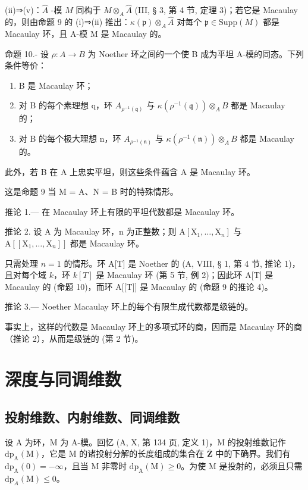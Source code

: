 (ii)⇒(v)：\(\hat{A}\) -模 \(\hat{M}\) 同构于 \(M\otimes_{A}\hat{A}\) (III, § 3, 第 4 节, 定理 3)；若它是 Macaulay 的，则由命题 9 的 (i)⇒(ii) 推出：\(\kappa(\mathfrak{p})\otimes_{A}\hat{A}\) 对每个 \(\mathfrak{p}\in\mathrm{Supp}(M)\) 都是 Macaulay 环，且 A-模 M 是 Macaulay 的。

命题 10.- 设 \(\rho: A \to B\) 为 Noether 环之间的一个使 B 成为平坦 A-模的同态。下列条件等价：

\begin{enumerate}
\def\labelenumi{(\roman{enumi})}
\item
  B 是 Macaulay 环；
\item
  对 B 的每个素理想 q，环 \(A_{\rho^{-1}(\mathfrak{q})}\) 与 \(\kappa(\rho^{-1}(\mathfrak{q}))\otimes_{A}B\) 都是 Macaulay 的；
\item
  对 B 的每个极大理想 n，环 \(A_{\rho^{-1}(\mathfrak{n})}\) 与 \(\kappa(\rho^{-1}(\mathfrak{n})) \otimes_{A} B\) 都是 Macaulay 的。
\end{enumerate}

此外，若 B 在 A 上忠实平坦，则这些条件蕴含 A 是 Macaulay 环。

这是命题 9 当 M = A、N = B 时的特殊情形。

推论 1.--- 在 Macaulay 环上有限的平坦代数都是 Macaulay 环。

推论 2. 设 A 为 Macaulay 环，n 为正整数；则 \(\mathrm{A}[\mathrm{X}_1,\dots ,\mathrm{X}_n]\) 与 \(\mathrm{A}[[\mathrm{X}_1,\dots ,\mathrm{X}_n]]\) 都是 Macaulay 环。

只需处理 \(n = 1\) 的情形。环 A{[}T{]} 是 Noether 的 (A, VIII, § 1, 第 4 节, 推论 1)，且对每个域 \(k\)，环 \(k[T]\) 是 Macaulay 环 (第 5 节, 例 2)；因此环 A{[}T{]} 是 Macaulay 的 (命题 10)，而环 A{[}{[}T{]}{]} 是 Macaulay 的 (命题 9 的推论 4)。

推论 3.--- Noether Macaulay 环上的每个有限生成代数都是级链的。

事实上，这样的代数是 Macaulay 环上的多项式环的商，因而是 Macaulay 环的商（推论 2），从而是级链的 (第 2 节)。

\section{深度与同调维数}

\subsection{投射维数、内射维数、同调维数}

设 A 为环，M 为 A-模。回忆 (A, X, 第 134 页, 定义 1)，M 的投射维数记作 \(\mathrm{dp}_{\mathrm{A}}(\mathrm{M})\)，它是 M 的诸投射分解的长度组成的集合在 \(\overline{\mathbf{Z}}\) 中的下确界。我们有 \(\mathrm{dp}_{\mathrm{A}}(0) = -\infty\)，且当 M 非零时 \(\mathrm{dp}_{\mathrm{A}}(\mathrm{M}) \geqslant 0\)。为使 M 是投射的，必须且只需 \(\mathrm{dp}_{A}(\mathrm{M}) \leqslant 0\)。

